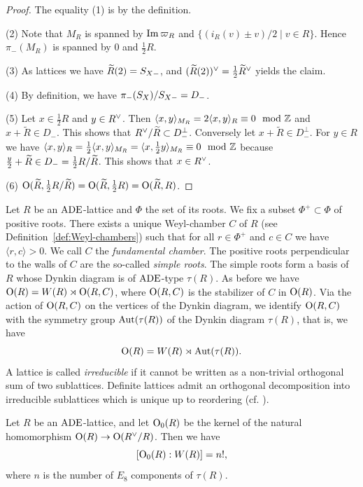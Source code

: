 \documentclass{amsart}
\numberwithin{procedure}{section}
\newcommand{\rl}{R}
\newcommand{\trl}{\widetilde{\rl}}
\newcommand{\arl}{\Aut(\tau(\rl))}
\begin{document}
\begin{proof}
 The equality (1) is by the definition.
 \par
 (2) Note that $M_R$ is spanned by $\operatorname{\mathrm{Im}}\nolimits \varpi_R$ 
 and $\{(i_R(v) \pm v)/2 \mid v \in R\}$. 
 Hence $\pi_-(M_R)$ is spanned by $0$ and $\tfrac{1}{2}R$.
\par
 (3) As lattices we have $\widetilde{R}(2) = S_{X-}$,
  and $(\widetilde{R}(2))\sp{\vee}  = \tfrac{1}{2}\widetilde{R}\sp{\vee} $ yields the claim.
\par
 (4) By definition,  we have $\pi_{-}(S_{X})/S_{X-}=D_{-}$.
\par
 (5) Let $x \in \tfrac{1}{2}R$ and $y \in R\sp{\vee} $. Then
 $\langle x, y \rangle_{M_R} = 2 \langle x, y \rangle_R\equiv 0 \mod {\mathord{\mathbb Z}}$
 and $x +\trl \in D_-$.  This shows that $\rl\dual /\trl\subset D_-^\perp$.
 Conversely let $x +\trl \in D_-^\perp$. 
 For $y \in R$ we have
 $\langle x ,y \rangle_R 
 = \tfrac{1}{2} \langle x , y \rangle_{M_R}
 =\langle x ,\tfrac{1}{2}  y \rangle_{M_R} \equiv 0 \mod {\mathord{\mathbb Z}}$ 
 because $\tfrac{y}{2}+\trl \in D_-=\tfrac{1}{2}R/\Rtil$.
 This shows that $x \in R\sp{\vee} $.
\par
 (6) $\OG(\trl,\tfrac{1}{2}\rl/\trl) = \OG(\trl,\tfrac{1}{2}\rl) = \OG(\trl,\rl)$.
 \end{proof}
%
Let $\rl$ be an $\mathord{\rm ADE}$-lattice and $\Phi$ the set of its roots.
We fix a subset $\Phi^+\subset \Phi$ of positive roots. 
There exists
a unique Weyl-chamber $C$ of $\rl$ (see Definition~\ref{def:Weyl-chambers})
such that for all $r \in \Phi^+$ and $c \in C$ we have $\langle r, c\rangle>0$. 
We call $C$ the \emph{fundamental chamber}.
The positive roots perpendicular to the walls of $C$ are the so-called \emph{simple roots}.
The simple roots form a basis of $\rl$ whose Dynkin diagram is of $\mathord{\rm ADE}$-type $\tau(\rl)$.
As before we have $\OG(\rl) = W(\rl) \rtimes \OG(\rl,C)$,
where $\OG(\rl,C)$ is the 
stabilizer of $C$ in $\OG(\rl)$.
Via the action of $\OG(\rl,C)$ on the vertices of the Dynkin diagram,
we identify $\OG(\rl,C)$ 
with the symmetry group $\arl$ of the Dynkin diagram $\tau(\rl)$,
that is, we have 
\[
\OG(\rl)=W(\rl) \rtimes \Aut(\tau(\rl)).
\]
A lattice is called \emph{irreducible} if it cannot be written as a non-trivial
orthogonal sum of two sublattices. 
Definite lattices admit an orthogonal decomposition
into irreducible sublattices which is unique up to reordering (cf. \cite[27.1]{kneser}).
%
\begin{lemma}\label{lem:imWR}
 Let $\rl$ be an $\mathord{\rm ADE}$-lattice, and
let $\OG_0(\rl)$ be the kernel of the natural homomorphism
$\OG(\rl) \rightarrow \OG(\rl\dual /\rl)$.
 Then we have
 \[[\OG_0(\rl):W(\rl)]=n!,\]
 where $n$ is the
 number of $E_8$ components of $\tau(\rl)$.
\end{lemma}
\end{document}
